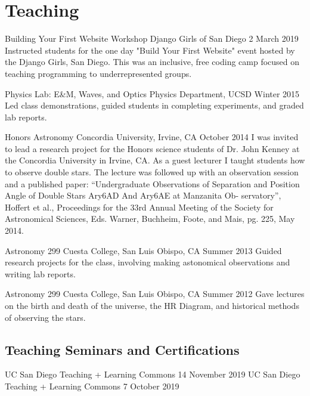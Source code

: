 \section{Teaching}

    {Building Your First Website Workshop}
    {Django Girls of San Diego}
    {2 March 2019}
Instructed students for the one day "Build Your First Website" event hosted by the Django Girls, San Diego.
This was an inclusive, free coding camp focused on teaching programming to underrepresented groups.

    {Physics Lab: E\&M, Waves, and Optics}
    {Physics Department, UCSD}
    {Winter 2015} 
Led class demonstrations, guided students in completing experiments, and graded lab reports.

    {Honors Astronomy}
    {Concordia University, Irvine, CA}
    {October 2014}
I was invited to lead a research project for the Honors science students of Dr. John Kenney at the Concordia University in Irvine, CA. As a guest lecturer I taught students how to observe double stars. The lecture was followed up with an observation session and a published paper:
``Undergraduate Observations of Separation and Position Angle of Double Stars Ary6AD And Ary6AE at Manzanita Ob- servatory'', Hoffert et al., Proceedings for the 33rd Annual Meeting of the Society for Astronomical Sciences, Eds. Warner, Buchheim, Foote, and Mais, pg. 225, May 2014.

    {Astronomy 299}
    {Cuesta College, San Luis Obispo, CA}
    {Summer 2013}
Guided research projects for the class, involving making astonomical observations and writing lab reports.

    {Astronomy 299}
    {Cuesta College, San Luis Obispo, CA}
    {Summer 2012}
Gave lectures on the birth and death of the universe, the HR Diagram, and historical methods of observing the stars.

\subsection{Teaching Seminars and Certifications}
    {UC San Diego Teaching + Learning Commons}
    {14 November 2019}
    {UC San Diego Teaching + Learning Commons}
    {7 October 2019}
